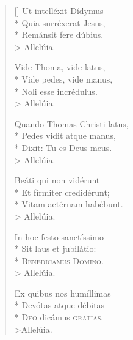 \begin{multicols}{2}
\begin{verse}[\versewidth]
Ut intelléxit Dídymus\\*
Quia surréxerat Jesus,    \\*
Remánsit fere dúbius.   \\>  Allelúia. 

Vide Thoma, vide latus,\\*
Vide pedes, vide manus,   \\*
Noli esse incrédulus.    \\> Allelúia. 

Quando Thomas Christi latus,\\*%
Pedes vidit atque manus,\\*%
Dixit: Tu es Deus meus.     \\>  Allelúia.

Beáti qui non vidérunt \\*  
Et fírmiter credidérunt; \\*
Vitam aetérnam habébunt. \\>  Allelúia.  

In hoc festo sanctíssimo\\*
Sit laus et jubilátio:   \\*
\textsc{Benedicamus Domino.} \\> Allelúia.  

Ex quibus nos humíllimas\\*
Devótas atque débitas    \\*
\textsc{Deo} dicámus \textsc{gratias.}\\>Allelúia.

\end{verse}
\end{multicols}


